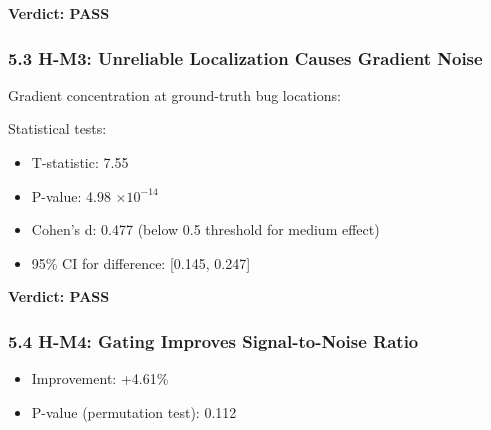 \textbf{Verdict: PASS}

\subsubsection{5.3 H-M3: Unreliable Localization Causes Gradient Noise}

Gradient concentration at ground-truth bug locations:

\begin{table}[htbp]
\centering
{}
\end{table}

Statistical tests:
\begin{itemize}
\item T-statistic: 7.55
\item P-value: 4.98 $\times 10^{-14}$
\item Cohen's d: 0.477 (below 0.5 threshold for medium effect)
\item 95\% CI for difference: [0.145, 0.247]
\end{itemize}

\textbf{Verdict: PASS}

\subsubsection{5.4 H-M4: Gating Improves Signal-to-Noise Ratio}

\begin{table}[htbp]
\centering
{}
\end{table}

\begin{itemize}
\item Improvement: +4.61\%
\item P-value (permutation test): 0.112
\end{itemize}

